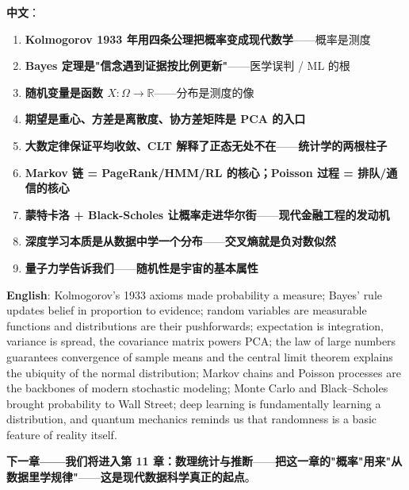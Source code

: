 \begin{tcolorbox}[essbox={本章小结}]
\textbf{中文}：
\begin{enumerate}
\item \textbf{Kolmogorov 1933 年用四条公理把概率变成现代数学}——概率是测度
\item \textbf{Bayes 定理是"信念遇到证据按比例更新"}——医学误判 / ML 的根
\item \textbf{随机变量是函数 $X: \Omega \to \mathbb{R}$}——分布是测度的像
\item \textbf{期望是重心、方差是离散度、协方差矩阵是 PCA 的入口}
\item \textbf{大数定律保证平均收敛、CLT 解释了正态无处不在}——\textbf{统计学的两根柱子}
\item \textbf{Markov 链 = PageRank/HMM/RL 的核心；Poisson 过程 = 排队/通信的核心}
\item \textbf{蒙特卡洛 + Black-Scholes 让概率走进华尔街}——\textbf{现代金融工程的发动机}
\item \textbf{深度学习本质是从数据中学一个分布}——\textbf{交叉熵就是负对数似然}
\item \textbf{量子力学告诉我们}——\textbf{随机性是宇宙的基本属性}
\end{enumerate}
\textbf{English}: Kolmogorov's 1933 axioms made probability a measure; Bayes' rule updates belief in proportion to evidence; random variables are measurable functions and distributions are their pushforwards; expectation is integration, variance is spread, the covariance matrix powers PCA; the law of large numbers guarantees convergence of sample means and the central limit theorem explains the ubiquity of the normal distribution; Markov chains and Poisson processes are the backbones of modern stochastic modeling; Monte Carlo and Black–Scholes brought probability to Wall Street; deep learning is fundamentally learning a distribution, and quantum mechanics reminds us that randomness is a basic feature of reality itself.
\end{tcolorbox}

\textbf{下一章——我们将进入第 11 章：数理统计与推断}——\textbf{把这一章的"概率"用来"从数据里学规律"}——\textbf{这是现代数据科学真正的起点}。

\clearpage

